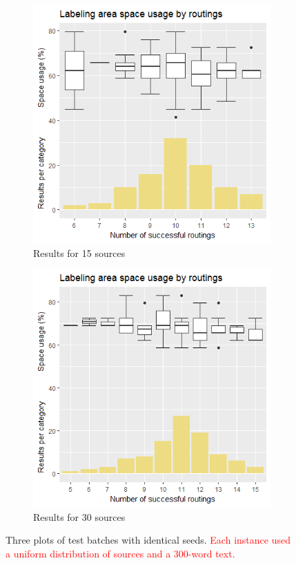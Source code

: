 \documentclass[11pt,a4paper]{vutinfth}
\newcommand{\change}[1]{\textcolor{red}{#1}}
\begin{document}
\begin{figure}
 	\begin{subfigure}[b]{\textwidth}
 		\centering
 		\includegraphics[scale=0.6]{Rplot_15u.png}
 		\caption{\label{fig:15u}Results for 15 sources}
 	\end{subfigure}
    \begin{subfigure}[b]{\textwidth}
		 \centering
		 \includegraphics[scale=0.6]{Rplot_30u.png}
		 \caption{\label{fig:30u}Results for 30 sources}
    \end{subfigure}
 
 	\caption{Three plots of test batches with identical seeds. \change{Each instance used a uniform distribution of sources and a 300-word text.}}
 	\label{fig:uniformstats}
 \end{figure}
\end{document}
